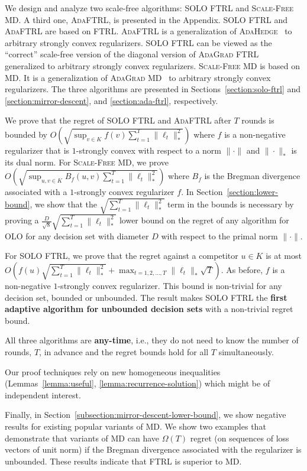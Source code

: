 We design and analyze two scale-free algorithms: \textsc{SOLO FTRL} and
\textsc{Scale-Free MD}.  A third one, \textsc{AdaFTRL}, is presented in
the Appendix. \textsc{SOLO FTRL} and \textsc{AdaFTRL} are based on
\textsc{FTRL}.  \textsc{AdaFTRL} is a generalization of
\textsc{AdaHedge}~\cite{de-Rooij-van-Erven-Grunwald-Koolen-2014} to arbitrary
strongly convex regularizers.  \textsc{SOLO FTRL} can be viewed as the
``correct'' scale-free version of the diagonal version of \textsc{AdaGrad
FTRL}~\cite{Duchi-Hazan-Singer-2011} generalized to arbitrary strongly convex
regularizers.  \textsc{Scale-Free MD} is based on \textsc{MD}. It is a
generalization of \textsc{AdaGrad MD}~\cite{Duchi-Hazan-Singer-2011} to
arbitrary strongly convex regularizers.  The three algorithms are presented in
Sections~\ref{section:solo-ftrl} and \ref{section:mirror-descent}, and
\ref{section:ada-ftrl}, respectively.

We prove that the regret of \textsc{SOLO FTRL} and \textsc{AdaFTRL} after $T$
rounds is bounded by $O (\sqrt{\sup_{v \in K} f(v) \sum_{t=1}^T\|\ell_t\|_*^2} )$
where $f$ is a non-negative regularizer that is $1$-strongly convex with respect
to a norm $\|\cdot\|$ and $\|\cdot\|_*$ is its dual norm. For \textsc{Scale-Free
MD}, we prove $O (\sqrt{\sup_{u,v \in K} B_f(u,v) \sum_{t=1}^T\|\ell_t\|_*^2} )$
where $B_f$ is the Bregman divergence associated with a $1$-strongly convex
regularizer $f$. In Section~\ref{section:lower-bound}, we show that the
$\sqrt{\sum_{t=1}^T \|\ell_t\|_*^2}$ term in the bounds is necessary by proving
a $\frac{D}{\sqrt{8}} \sqrt{\sum_{t=1}^T\|\ell_t\|_*^2}$ lower bound on the
regret of any algorithm for OLO for any decision set with diameter $D$ with
respect to the primal norm $\|\cdot\|$.

For \textsc{SOLO FTRL}, we prove that the regret against a competitor $u \in K$
is at most $O (f(u) \sqrt{\sum_{t=1}^T \|\ell_t\|_*^2} + \max_{t=1,2,\dots,T}
\|\ell_t\|_* \sqrt{T} )$.  As before, $f$ is a non-negative $1$-strongly convex
regularizer. This bound is non-trivial for any decision set, bounded or
unbounded.  The result makes \textsc{SOLO FTRL} the \textbf{first adaptive
algorithm for unbounded decision sets} with a non-trivial regret bound.

All three algorithms are \textbf{any-time}, i.e., they do not need to know the
number of rounds, $T$, in advance and the regret bounds hold for all $T$
simultaneously.

Our proof techniques rely on new homogeneous
inequalities (Lemmas~\ref{lemma:useful}, \ref{lemma:recurrence-solution})
which might be of independent interest.

Finally, in Section~\ref{subsection:mirror-descent-lower-bound}, we show
negative results for existing popular variants of \textsc{MD}. We show two
examples that demonstrate that variants of \textsc{MD} can have $\Omega(T)$
regret (on sequences of loss vectors of unit norm) if the Bregman divergence
associated with the regularizer is unbounded. These results indicate that
\textsc{FTRL} is superior to \textsc{MD}.
